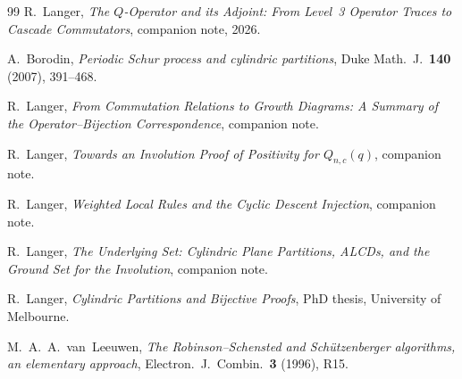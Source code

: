 \documentclass[11pt]{article}
\theoremstyle{plain}
\theoremstyle{definition}
\begin{document}
\begin{thebibliography}{99}
  R.~Langer,
  \emph{The $Q$-Operator and its Adjoint: From Level~3 Operator
  Traces to Cascade Commutators},
  companion note, 2026.

  A.~Borodin,
  \emph{Periodic Schur process and cylindric partitions},
  Duke Math.~J.\ \textbf{140} (2007), 391--468.

  R.~Langer,
  \emph{From Commutation Relations to Growth Diagrams:
  A Summary of the Operator--Bijection Correspondence},
  companion note.

  R.~Langer,
  \emph{Towards an Involution Proof of Positivity for $Q_{n,c}(q)$},
  companion note.

  R.~Langer,
  \emph{Weighted Local Rules and the Cyclic Descent Injection},
  companion note.

  R.~Langer,
  \emph{The Underlying Set: Cylindric Plane Partitions, ALCDs,
  and the Ground Set for the Involution},
  companion note.

  R.~Langer,
  \emph{Cylindric Partitions and Bijective Proofs},
  PhD thesis, University of Melbourne.

  M.~A.~A.~van~Leeuwen,
  \emph{The Robinson--Schensted and Sch\"utzenberger algorithms,
  an elementary approach},
  Electron.~J.~Combin.\ \textbf{3} (1996), R15.
\end{thebibliography}
\end{document}
